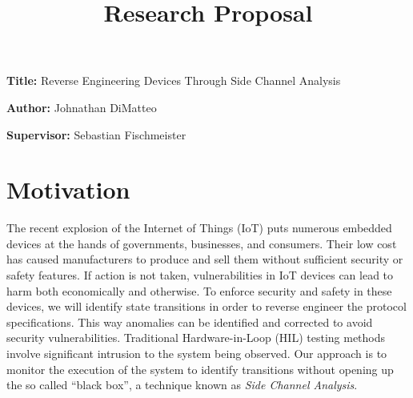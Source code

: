 \documentclass[11pt, a4paper]{article}
\title{Research Proposal}
\author{}
\date{}
\newcommand{\namelistlabel}[1]{\mbox{#1}\hfil}
\newenvironment{namelist}[1]{%
\begin{list}{}
    {
        \let\makelabel\namelistlabel
        \settowidth{\labelwidth}{#1}
        \setlength{\leftmargin}{1.1\labelwidth}
    }
  }{%
\end{list}}
\begin{document}
\maketitle

\begin{namelist}{xxxxxxxxxxxx}
\item[{\bf Title:}]
	Reverse Engineering Devices Through Side Channel Analysis
\item[{\bf Author:}]
	Johnathan DiMatteo
\item[{\bf Supervisor:}]
	Sebastian Fischmeister
\end{namelist}

\section*{Motivation} 


The recent explosion of the Internet of Things (IoT) puts numerous embedded devices at the hands of governments, businesses, and consumers.
Their low cost has caused manufacturers to produce and sell them without sufficient security or safety features.
If action is not taken, vulnerabilities in IoT devices can lead to harm both economically and otherwise.
To enforce security and safety in these devices, we will identify state transitions in order to reverse engineer the protocol specifications.
This way anomalies can be identified and corrected to avoid security vulnerabilities.
Traditional Hardware-in-Loop (HIL) testing methods involve significant intrusion to the system being observed.
Our approach is to monitor the execution of the system to identify transitions without opening up the so called ``black box'', a technique known as \textit{Side Channel Analysis}. 



\end{document}
